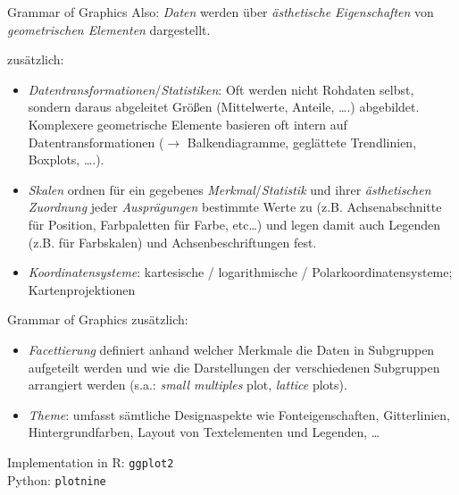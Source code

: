 \documentclass[
  10pt,
  ignorenonframetext,
]{beamer}
\providecommand{\tightlist}{%
  \setlength{\itemsep}{0pt}\setlength{\parskip}{0pt}}
\begin{document}
\begin{frame}{Grammar of Graphics}
\label{grammar-of-graphics-2}
Also: \emph{Daten} werden über \emph{ästhetische Eigenschaften} von
\emph{geometrischen Elementen} dargestellt.

zusätzlich:

\begin{itemize}
\tightlist
\item
  \emph{Datentransformationen}/\emph{Statistiken}: Oft werden nicht
  Rohdaten selbst, sondern daraus abgeleitet Größen (Mittelwerte,
  Anteile, \ldots.) abgebildet. Komplexere geometrische Elemente
  basieren oft intern auf Datentransformationen (\(\rightarrow\)
  Balkendiagramme, geglättete Trendlinien, Boxplots, \ldots.).
\item
  \emph{Skalen} ordnen für ein gegebenes \emph{Merkmal}/\emph{Statistik}
  und ihrer \emph{ästhetischen Zuordnung} jeder \emph{Ausprägungen}
  bestimmte Werte zu (z.B. Achsenabschnitte für Position, Farbpaletten
  für Farbe, etc\ldots) und legen damit auch Legenden (z.B. für
  Farbskalen) und Achsenbeschriftungen fest.
\item
  \emph{Koordinatensysteme}: kartesische / logarithmische /
  Polarkoordinatensysteme; Kartenprojektionen
\end{itemize}
\end{frame}

\begin{frame}[fragile]{Grammar of Graphics}
\label{grammar-of-graphics-3}
zusätzlich:

\begin{itemize}
\tightlist
\item
  \emph{Facettierung} definiert anhand welcher Merkmale die Daten in
  Subgruppen aufgeteilt werden und wie die Darstellungen der
  verschiedenen Subgruppen arrangiert werden (s.a.: \emph{small
  multiples} plot, \emph{lattice} plots).
\item
  \emph{Theme}: umfasst sämtliche Designaspekte wie Fonteigenschaften,
  Gitterlinien, Hintergrundfarben, Layout von Textelementen und
  Legenden, \ldots{}
\end{itemize}

Implementation in R: \texttt{ggplot2}\\
Python: \texttt{plotnine}
\end{frame}
\end{document}
